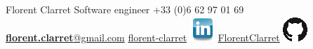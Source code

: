 \documentclass[]{friggeri-cv}
\begin{document}
\header{}
				{Florent Clarret} 
				{Software engineer}
				{+33 (0)6 62 97 01 69}
				{\href{mailto:florent.clarret@gmail.com}{\textbf{florent.clarret}@gmail.com} }
				{\href{https://www.linkedin.com/in/florent-clarret/}{florent-clarret} \includegraphics{../img/linkedin.png}}
				{\href{https://github.com/FlorentClarret}{FlorentClarret} \includegraphics{../img/github.png}}
	
\end{document}
